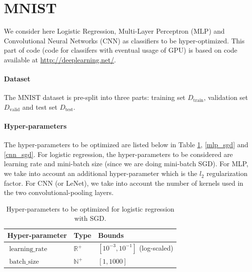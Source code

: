 \documentclass[runningheads,a4paper]{llncs}
\begin{document}
\section{MNIST}

We consider here Logistic Regression, Multi-Layer Perceptron (MLP) and Convolutional Neural Networks (CNN) as classifiers to be hyper-optimized. This part of code (code for classifers with eventual usage of GPU) is based on code available at \url{http://deeplearning.net/}. 

\paragraph{\textbf{Dataset}} The MNIST dataset is pre-split into three parts: training set $D_{\operatorname{train}}$, validation set $D_{\operatorname{valid}}$ and test set $D_{\operatorname{test}}$.

\paragraph{\textbf{Hyper-parameters}} The hyper-parameters to be optimized are listed below in Table \ref{logistic_sgd}, \ref{mlp_sgd} and \ref{cnn_sgd}. For logistic regression, the hyper-parameters to be considered are learning rate and mini-batch size (since we are doing mini-batch SGD). For MLP, we take into account an additional hyper-parameter which is the $l_2$ regularization factor. For CNN (or LeNet), we take into account the number of kernels used in the two convolutional-pooling layers.

\begin{table}[ht]
\centering
\begin{tabular}{@{}lll@{}}
\toprule
\textbf{Hyper-parameter} & \textbf{Type}                      & \textbf{Bounds}               \\ \midrule
$\operatorname{learning\_rate}$                & $\mathbb{R}^+$ & $\left[ 10^{-3}, 10^{-1} \right]$ (log-scaled) \\
$\operatorname{batch\_size}$           & $\mathbb{N}^+$ & $\left[1, 1000 \right]$         \\ \bottomrule
\end{tabular}
\caption{Hyper-parameters to be optimized for logistic regression with SGD.}
\label{logistic_sgd}
\end{table}
\end{document}

